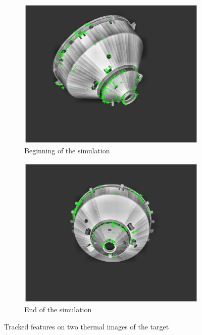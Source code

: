 \begin{figure}[!h]
    \begin{subfigure}{0.48\linewidth}
    \centering
    \includegraphics[width = 1\linewidth]{Images/TIRbeginning1.eps}
    \caption{Beginning of the simulation}
    \label{fig:TIRupVespa}
    \end{subfigure}\hfill
    \begin{subfigure}{0.48\linewidth}
    \centering
    \includegraphics[width = 1\linewidth]{Images/TIRend.eps}
    \caption{End of the simulation}
    \label{fig:TIRDownVespa}
    \end{subfigure}
    \caption{Tracked features on two thermal images of the target}
    \label{fig:TIRUpDownVespa}
\end{figure}


